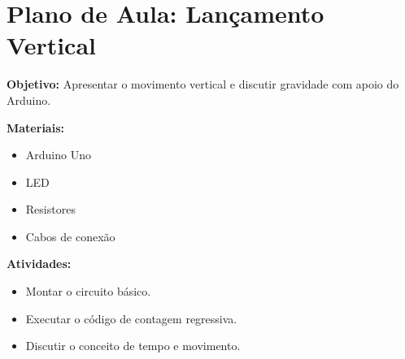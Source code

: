 \documentclass{article}
\begin{document}
\section*{Plano de Aula: Lançamento Vertical}

\textbf{Objetivo:} Apresentar o movimento vertical e discutir gravidade com apoio do Arduino.

\textbf{Materiais:}
\begin{itemize}
  \item Arduino Uno
  \item LED
  \item Resistores
  \item Cabos de conexão
\end{itemize}

\textbf{Atividades:}
\begin{itemize}
  \item Montar o circuito básico.
  \item Executar o código de contagem regressiva.
  \item Discutir o conceito de tempo e movimento.
\end{itemize}
\end{document}
